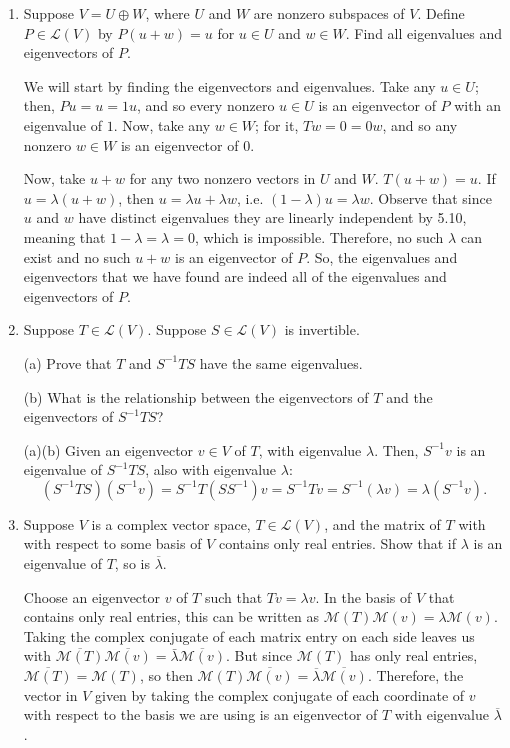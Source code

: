\documentclass{book}
\begin{document}
\begin{enumerate}
\item Suppose \(V=U \oplus W\), where \(U\) and \(W\) are nonzero subspaces of \(V\).  Define \(P \in \mathcal{L}(V)\) by \(P(u+w)=u\) for \(u \in U\) and \(w \in W\).  Find all eigenvalues and eigenvectors of \(P\).

We will start by finding the eigenvectors and eigenvalues.  Take any \(u \in U\); then, \(Pu=u=1u\), and so every nonzero \(u \in U\) is an eigenvector of \(P\) with an eigenvalue of \(1\).  Now, take any \(w \in W\); for it, \(Tw=0=0w\), and so any nonzero \(w \in W\) is an eigenvector of \(0\).

Now, take \(u+w\) for any two nonzero vectors in \(U\) and \(W\).  \(T(u+w)=u\).  If \(u=\lambda(u+w)\), then \(u=\lambda{u}+\lambda{w}\), i.e. \((1-\lambda)u=\lambda{w}\).  Observe that since \(u\) and \(w\) have distinct eigenvalues they are linearly independent by 5.10, meaning that \(1-\lambda=\lambda=0\), which is impossible.  Therefore, no such \(\lambda\) can exist and no such \(u+w\) is an eigenvector of \(P\).  So, the eigenvalues and eigenvectors that we have found are indeed all of the eigenvalues and eigenvectors of \(P\).

\item Suppose \(T \in \mathcal{L}(V)\).  Suppose \(S \in \mathcal{L}(V)\) is invertible.

(a) Prove that \(T\) and \(S^{-1}TS\) have the same eigenvalues.

(b) What is the relationship between the eigenvectors of \(T\) and the eigenvectors of \(S^{-1}TS\)?

(a)(b) Given an eigenvector \(v \in V\) of \(T\), with eigenvalue \(\lambda\).  Then, \(S^{-1}v\) is an eigenvalue of \(S^{-1}TS\), also with eigenvalue \(\lambda\): \[(S^{-1}TS)(S^{-1}v) = S^{-1}T(SS^{-1})v = S^{-1}Tv = S^{-1}(\lambda v) = \lambda(S^{-1}v).\]

\item Suppose \(V\) is a complex vector space, \(T \in \mathcal{L}(V)\), and the matrix of \(T\) with with respect to some basis of \(V\) contains only real entries.  Show that if \(\lambda\) is an eigenvalue of \(T\), so is \(\overline{\lambda}\).

Choose an eigenvector \(v\) of \(T\) such that \(Tv=\lambda v\).  In the basis of \(V\) that contains only real entries, this can be written as \(\mathcal{M}(T) \mathcal{M}(v) = \lambda \mathcal{M}(v)\).  Taking the complex conjugate of each matrix entry on each side leaves us with \(\overline{\mathcal{M}(T)} \overline{\mathcal{M}(v)} = \bar{\lambda} \overline{\mathcal{M}(v)}\).  But since \(\mathcal{M}(T)\) has only real entries, \(\overline{\mathcal{M}(T)} = \mathcal{M}(T)\), so then \(\mathcal{M}(T) \overline{\mathcal{M}(v)} = \overline{\lambda} \overline{\mathcal{M}(v)}\).  Therefore, the vector in \(V\) given by taking the complex conjugate of each coordinate of \(v\) with respect to the basis we are using is an eigenvector of \(T\) with eigenvalue \(\overline{\lambda}\).


\end{enumerate}
\end{document}

